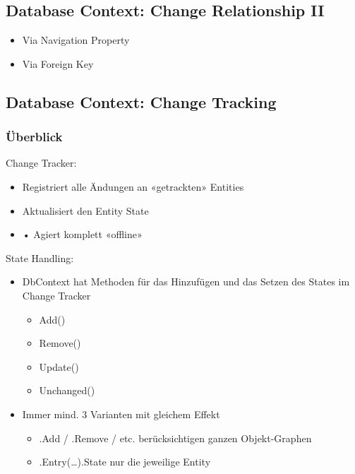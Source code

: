 \subsection{Database Context: Change Relationship II}
\begin{itemize}
    \item Via Navigation Property
    \item Via Foreign Key
\end{itemize}

\subsection{Database Context: Change Tracking}
\subsubsection{Überblick}
Change Tracker:
\begin{itemize}
    \item Registriert alle Ändungen an «getrackten» Entities
    \item Aktualisiert den Entity State
    \item • Agiert komplett «offline»
\end{itemize}
State Handling:
\begin{itemize}
    \item DbContext hat Methoden für das Hinzufügen und das Setzen des States im Change Tracker
    \begin{itemize}
        \item Add()
        \item Remove()
        \item Update()
        \item Unchanged()
    \end{itemize}
    \item Immer mind. 3 Varianten mit gleichem Effekt
    \begin{itemize}
        \item .Add / .Remove / etc. berücksichtigen ganzen Objekt-Graphen 
        \item .Entry(…).State nur die jeweilige Entity
    \end{itemize}
\end{itemize}
\vspace{-8pt}
